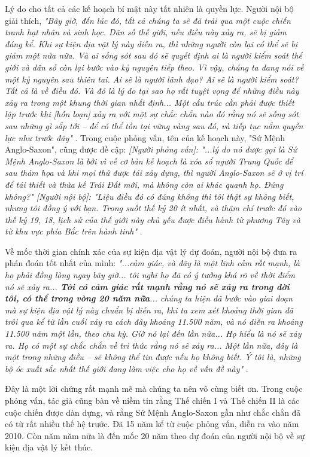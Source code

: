 \documentclass[10pt,twocolumn,letterpaper]{article}
\begin{document}
Lý do cho tất cả các kế hoạch bí mật này tất nhiên là quyền lực. Người nội bộ giải thích, \textit{"Bây giờ, đến lúc đó, tất cả chúng ta sẽ đã trải qua một cuộc chiến tranh hạt nhân và sinh học. Dân số thế giới, nếu điều này xảy ra, sẽ bị giảm đáng kể. Khi sự kiện địa vật lý này diễn ra, thì những người còn lại có thể sẽ bị giảm một nửa nữa. Và ai sống sót sau đó sẽ quyết định ai là người kiểm soát thế giới và dân số còn lại bước vào kỷ nguyên tiếp theo. Vì vậy, chúng ta đang nói về một kỷ nguyên sau thiên tai. Ai sẽ là người lãnh đạo? Ai sẽ là người kiểm soát? Tất cả là về điều đó. Và đó là lý do tại sao họ rất tuyệt vọng để những điều này xảy ra trong một khung thời gian nhất định... Một cấu trúc cần phải được thiết lập trước khi [hỗn loạn] xảy ra với một sự chắc chắn nào đó rằng nó sẽ sống sót sau những gì sắp tới -- để có thể tồn tại vững vàng sau đó, và tiếp tục nắm quyền lực như trước đây"} \cite{4}. Trong cuộc phỏng vấn, tên của kế hoạch này, "Sứ Mệnh Anglo-Saxon", cũng được đề cập: \textit{[Người phỏng vấn]: "...lý do nó được gọi là Sứ Mệnh Anglo-Saxon là bởi vì về cơ bản kế hoạch là xóa sổ người Trung Quốc để sau thảm họa và khi mọi thứ được tái xây dựng, thì người Anglo-Saxon sẽ ở vị trí để tái thiết và thừa kế Trái Đất mới, mà không còn ai khác quanh họ. Đúng không?" [Người nội bộ]: "Liệu điều đó có đúng không thì tôi thật sự không biết, nhưng tôi đồng ý với bạn. Trong suốt thế kỷ 20 ít nhất, và thậm chí trước đó vào thế kỷ 19, 18, lịch sử của thế giới này chủ yếu được điều hành từ phương Tây và từ khu vực phía Bắc trên hành tinh"} \cite{4}.

Về mốc thời gian chính xác của sự kiện địa vật lý dự đoán, người nội bộ đưa ra phán đoán tốt nhất của mình: \textit{"...cảm giác, và đây là một linh cảm rất mạnh, là họ phải đồng lòng ngay bây giờ... tôi nghĩ họ đã có ý tưởng khá rõ về thời điểm nó sẽ xảy ra... \textbf{Tôi có cảm giác rất mạnh rằng nó sẽ xảy ra trong đời tôi, có thể trong vòng 20 năm nữa}... chúng ta hiện đã bước vào giai đoạn mà sự kiện địa vật lý này chuẩn bị diễn ra, khi ta xem xét khoảng thời gian đã trôi qua kể từ lần cuối xảy ra cách đây khoảng 11.500 năm, và nó diễn ra khoảng 11.500 năm một lần, theo chu kỳ. Giờ nó lại đến lần nữa... Họ hiểu là nó sẽ xảy ra. Họ có một sự chắc chắn về tri thức rằng nó sẽ xảy ra... Một lần nữa, đây là một trong những điều -- sẽ không thể tin được nếu họ không biết. Ý tôi là, những bộ óc xuất sắc nhất thế giới đang làm việc cho họ về vấn đề này"} \cite{4}.

Đây là một lời chứng rất mạnh mẽ mà chúng ta nên vô cùng biết ơn. Trong cuộc phỏng vấn, tác giả cũng bàn về niềm tin rằng Thế chiến I và Thế chiến II là các cuộc chiến được dàn dựng, và rằng Sứ Mệnh Anglo-Saxon gần như chắc chắn đã có từ rất nhiều thế hệ trước. Đã 15 năm kể từ cuộc phỏng vấn, diễn ra vào năm 2010. Còn năm năm nữa là đến mốc 20 năm theo dự đoán của người nội bộ về sự kiện địa vật lý kết thúc.
\end{document}
